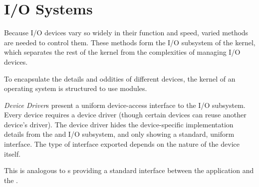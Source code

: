 \section{I/O Systems}\label{sec:IO_Systems}
Because I/O devices vary so widely in their function and speed, varied methods are needed to control them.
These methods form the I/O subsystem of the kernel, which separates the rest of the kernel from the complexities of managing I/O devices.

To encapsulate the details and oddities of different devices, the kernel of an operating system is structured to use  modules.

\begin{definition}\label{def:Device_Driver}
  \emph{Device Driver}s present a uniform device-access interface to the I/O subsystem.
  Every device requires a device driver (though certain devices can reuse another device's driver).
  The device driver hides the device-specific implementation details from the  and I/O subsystem, and only showing a standard, uniform interface.
  The type of interface exported depends on the nature of the device itself.

  This is analogous to s providing a standard interface between the application and the .
\end{definition}


